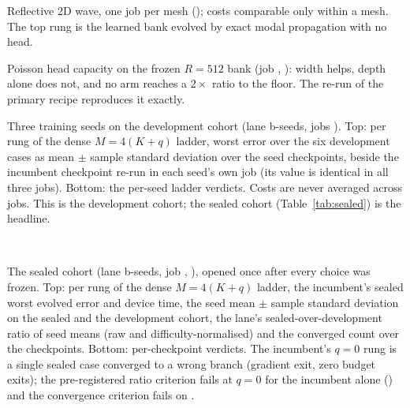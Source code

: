 \begin{table}[h]
\centering
\caption{Reflective 2D wave, one job per mesh (\provWaveJobs); costs
comparable only within a mesh. The top rung is the learned bank evolved by
exact modal propagation with no head.}
\label{tab:waves}

\end{table}

\begin{table}[h]
\centering
\caption{Poisson head capacity on the frozen $R=512$ bank (job
\provPlinHeadJob, \provPlinHeadGpu): width helps, depth alone does not, and
no arm reaches a $2\times$ ratio to the floor. The re-run of the primary
recipe reproduces it exactly.}
\label{tab:head-capacity}

\end{table}

\begin{table}[h]
\centering
\caption{Three training seeds on the development cohort (lane b-seeds, jobs
\provSeedsJobs). Top: per rung of the dense $M=4(K+q)$ ladder, worst error
over the six development cases as mean $\pm$ sample standard deviation over
the \nSeedsCount{} seed checkpoints, beside the incumbent checkpoint re-run in
each seed's own job (its value is identical in all three jobs). Bottom: the
per-seed ladder verdicts. Costs are never averaged across jobs. This is the
development cohort; the sealed cohort (Table~\ref{tab:sealed}) is the
headline.}
\label{tab:seeds}
\resizebox{\linewidth}{!}{}\\[4pt]
\resizebox{\linewidth}{!}{}
\end{table}

\begin{table}[h]
\centering
\caption{The sealed cohort (lane b-seeds, job \nSealedJob, \provSealedGpu),
opened once after every choice was frozen. Top: per rung of the dense
$M=4(K+q)$ ladder, the incumbent's sealed worst evolved error and device
time, the seed mean $\pm$ sample standard deviation on the sealed and the
development cohort, the lane's sealed-over-development ratio of seed means
(raw and difficulty-normalised) and the converged count over the
\nSealedCheckpoints{} checkpoints. Bottom: per-checkpoint verdicts. The
incumbent's $q=0$ rung is a single sealed case converged to a wrong branch
(gradient exit, zero budget exits); the pre-registered ratio criterion fails
at $q=0$ for the incumbent alone (\nSealedCtwoIncQzeroRatio) and the
convergence criterion fails on \nSealedUnconvergedCells.}
\label{tab:sealed}
\resizebox{\linewidth}{!}{}\\[4pt]
\resizebox{\linewidth}{!}{}
\end{table}

